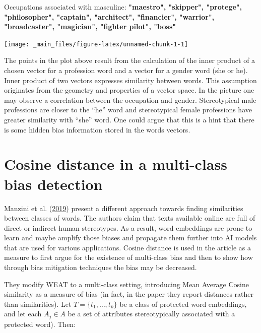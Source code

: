 \documentclass[12pt,]{book}
\begin{document}
Occupations associated with masculine:
\textbf{"maestro", "skipper", "protege", "philosopher", "captain", "architect", "financier", "warrior", "broadcaster", "magician", "fighter pilot", "boss"}

\vspace{1mm} \footnotesize

\begin{center}\texttt{[image: \_main\_files/figure-latex/unnamed-chunk-1-1]} \end{center}

\normalsize

The points in the plot above result from the calculation of the inner
product of a chosen vector for a profession word and a vector for a
gender word (she or he). Inner product of two vectors expresses
similarity between words. This assumption originates from the geometry
and properties of a vector space. In the picture one may observe a
correlation between the occupation and gender. Stereotypical male
professions are closer to the ``he'' word and stereotypical female
professions have greater similarity with ``she'' word. One could argue
that this is a hint that there is some hidden bias information stored in
the words vectors.

\section{Cosine distance in a multi-class bias
detection}\label{cosine-distance-in-a-multi-class-bias-detection}

Manzini et al.
(\protect\hyperlink{ref-Manzini2019blackToCriminal}{2019}) present a
different approach towards finding similarities between classes of
words. The authors claim that texts available online are full of direct
or indirect human stereotypes. As a result, word embeddings are prone to
learn and maybe amplify those biases and propagate them further into AI
models that are used for various applications. Cosine distance is used
in the article as a measure to first argue for the existence of
multi-class bias and then to show how through bias mitigation techniques
the bias may be decreased.

They modify WEAT to a multi-class setting, introducing Mean Average
Cosine similarity as a measure of bias (in fact, in the paper they
report distances rather than similarities). Let
\(T = \{t_1, \dots, t_k\}\) be a class of protected word embeddings, and
let each \(A_j\in A\) be a set of attributes stereotypically associated
with a protected word). Then:
\end{document}
